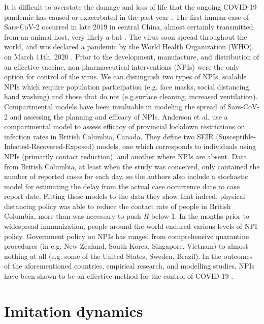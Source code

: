 It is difficult to overstate the damage and loss of life that the ongoing COVID-19 pandemic has caused or exacerbated in the past year \cite{miller2020disease,who2021impact}. The first human case of Sars-CoV-2 occurred in late 2019 in central China, almost certainly transmitted from an animal host, very likely a bat \cite{andersen2020proximal,rasmussen2021origins,zhu2020novel}. The virus soon spread throughout the world, and was declared a pandemic by the World Health Organization (WHO), on March 11th, 2020 \cite{who2020announces}. Prior to the development, manufacture, and distribution of an effective vaccine, non-pharmaceutical interventions (NPIs) were the only option for control of the virus. We can distinguish two types of NPIs, scalable NPIs which require population participation (e.g. face masks, social distancing, hand washing) and those that do not (e.g.surface cleaning, increased ventilation). Compartmental models have been invaluable in modeling the spread of Sars-CoV-2 \cite{thompson2020epidemiological} and assessing the planning and efficacy of NPIs. Anderson et al. \cite{anderson2020estimating} use a compartmental model to assess efficacy of provincial lockdown restrictions on infection rates in British Columbia, Canada. They define two SEIR (Susceptible-Infected-Recovered-Exposed) models, one which corresponds to individuals using NPIs (primarily contact reduction), and another where NPIs are absent. Data from British Columbia, at least when the study was conceived, only contained the number of reported cases for each day, so the authors also include a stochastic model for estimating the delay from the actual case occurrence date to case report date. Fitting these models to the data they show that indeed, physical distancing policy was able to reduce the contact rate of people in British Columbia, more than was necessary to push $R$ below 1. In the months prior to widespread immunization, people around the world endured various levels of NPI policy. Government policy on NPIs has ranged from comprehensive quarantine procedures (in e.g. New Zealand, South Korea, Singapore, Vietnam) to almost nothing at all (e.g. some of the United States, Sweden, Brazil). In the outcomes of the aforementioned countries, empirical research, and modelling studies, NPIs have been shown to be an effective method for the control of COVID-19 \cite{flaxman2020estimating,ferguson2020report,demirguc2020sooner}. 

\section{Imitation dynamics}

